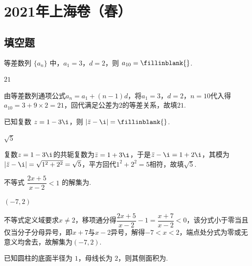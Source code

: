 \chapter{2021年上海卷（春）}

\section{填空题}

\begin{problem}
等差数列 \(\{a_n\}\) 中，\(a_1=3\)，\(d=2\)，则 \(a_{10}=\fillinblank{}\).
\end{problem}

\begin{answer}
\(21\)
\end{answer}

\begin{solution}
由等差数列通项公式\(a_n=a_1+\left( n-1 \right)d\)，将\(a_1=3\)，\(d=2\)，\(n=10\)代入得\(a_{10}=3+9\times 2=21\)，回代满足公差为\(2\)的等差关系，故填\(21\).
\end{solution}

\begin{problem}
已知复数 \(z=1-3\i\)，则 \(|\bar z-\i|=\fillinblank{}\).
\end{problem}

\begin{answer}
\(\sqrt5\)
\end{answer}

\begin{solution}
复数\(z=1-3\i\)的共轭复数为\(\bar z=1+3\i\)，于是\(\bar z-\i=1+2\i\)，其模为\(\left| \bar z-\i \right|=\sqrt{1^2+2^2}=\sqrt{5}\)，平方回代\(1^2+2^2=5\)相符，故填\(\sqrt{5}\).
\end{solution}

\begin{problem}
不等式 \(\dfrac{2x+5}{x-2}<1\) 的解集为\fillinblank{}.
\end{problem}

\begin{answer}
\((-7,2)\)
\end{answer}

\begin{solution}
不等式定义域要求\(x\ne 2\)，移项通分得\(\dfrac{2x+5}{x-2}-1=\dfrac{x+7}{x-2}<0\)，该分式小于零当且仅当分子分母异号，即\(x+7\)与\(x-2\)异号，解得\(-7<x<2\)，端点处分式为零或无意义均舍去，故解集为\(\left( -7,2 \right)\).
\end{solution}

\begin{problem}
已知圆柱的底面半径为 \(1\)，母线长为 \(2\)，则其侧面积为\fillinblank{}.
\end{problem}

